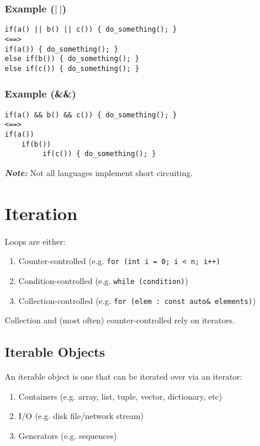 \documentclass{article}
\begin{document}
\subsubsection*{Example ($| \ |$)}
\begin{verbatim}
if(a() || b() || c()) { do_something(); }
<==>
if(a()) { do_something(); }
else if(b()) { do_something(); }
else if(c()) { do_something(); }
\end{verbatim}

\subsubsection*{Example (\&\&)}
\begin{verbatim}
if(a() && b() && c()) { do_something(); }
<==>
if(a()) 
    if(b()) 
         if(c()) { do_something(); }
\end{verbatim}
\textit{\textbf{Note:}} Not all languages implement short circuiting.





\section{Iteration}
Loops are either:
\begin{enumerate}[label=(\roman*)]
\item Counter-controlled (e.g. \texttt{for (int i = 0; i < n; i++)}
\item Condition-controlled (e.g. \texttt{while (condition)})
\item Collection-controlled (e.g. \texttt{for (elem : const auto\& elements)})
\end{enumerate}
Collection and (most often) counter-controlled rely on iterators.


\subsection{Iterable Objects}
An iterable object is one that can be iterated over via an iterator:
\begin{enumerate}[label=(\roman*)]
\item Containers (e.g. array, list, tuple, vector, dictionary, etc)
\item I/O (e.g. disk file/network stream)
\item Generators (e.g. sequences)
\end{enumerate}
\end{document}
